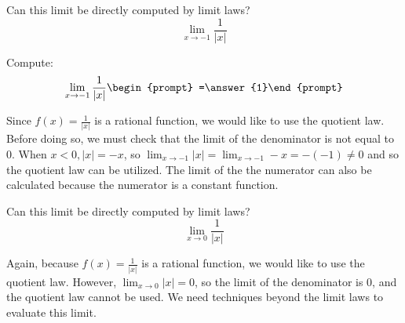 \documentclass[handout]{ximera}
\begin{document}
\begin{exercise}
  Can this limit be directly computed by limit laws?
  \[
  \displaystyle\lim_{x\to -1} \frac{1}{|x|}
  \]
  \begin{multipleChoice}
  \end{multipleChoice}
  \begin{question}
    Compute:
    \[
    \displaystyle\lim_{x\to -1} \frac{1}{|x|} \begin{prompt} =\answer{1}\end{prompt}
    \]
    \begin{feedback}
      Since $f(x)=\frac{1}{|x|}$ is a rational function, we would like to use the quotient law.  Before doing so, we must check that the limit of the denominator is not equal to $0$.  When $x < 0, |x| = -x$, so $\displaystyle\lim_{x\to -1} |x| = \displaystyle\lim_{x\to -1} -x = -(-1) \neq 0$ and so the quotient law can be utilized. The limit of the the numerator can also be calculated because the numerator is a constant function.  
    \end{feedback}
  \end{question}
\end{exercise}

\begin{exercise}
  Can this limit be directly computed by limit laws?
  \[
  \displaystyle\lim_{x\to 0} \frac{1}{|x|}
  \]
  \begin{multipleChoice}
    
     \begin{feedback}
      Again, because $f(x)=\frac{1}{|x|}$ is a rational function, we would like to use the quotient law.  However, $\displaystyle\lim_{x\to 0} |x| = 0$, so the limit of the denominator is $0$, and the quotient law cannot be used.  We need techniques beyond the limit laws to evaluate this limit. 
    \end{feedback}
    
  \end{multipleChoice}
\end{exercise}
\end{document}
